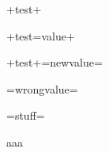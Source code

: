 \documentclass[english,ngerman,ttfont=roboto]{tudscrmanual}
\begin{document}

+test+

+test=value+

+test+=newvalue=

=wrongvalue=



\bigskip\bigskip\bigskip



=stuff=



aaa


%

\clearpage
\PrintIndex
\PrintChangelog
\end{document}
